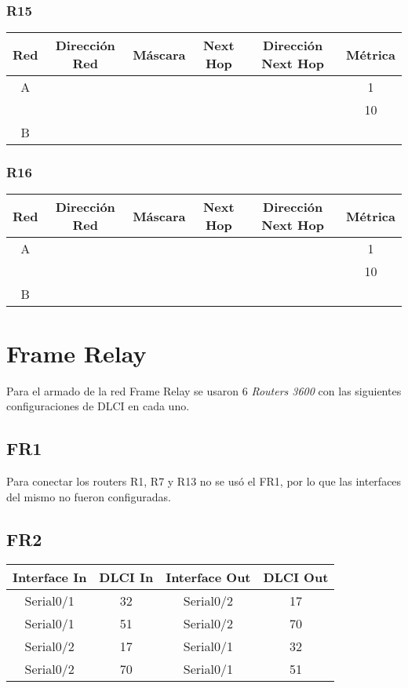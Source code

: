 \documentclass[12pt, a4paper, spanish]{article}
\begin{document}
\subsubsection{R15}
\begin{center}
\begin{tabular}{|c|c|c|c|c|c|}
	\hline
	Red & Dirección Red & Máscara & Next Hop & Dirección Next Hop & Métrica \\
	\hline
	\hline
	A &  &  &  &  & 1\\
 	  &  &  &  &  & 10 \\
	\hline	
	B & & & & &\\
	\hline
\end{tabular}
\end{center}

\subsubsection{R16}
\begin{center}
\begin{tabular}{|c|c|c|c|c|c|}
	\hline
	Red & Dirección Red & Máscara & Next Hop & Dirección Next Hop & Métrica \\
	\hline
	\hline
	A &  &  &  &  & 1\\
 	  &  &  &  &  & 10 \\
	\hline	
	B & & & & &\\
	\hline
\end{tabular}
\end{center}

\newpage
\section{Frame Relay}
Para el armado de la red Frame Relay se usaron 6 \emph{Routers 3600}
con las siguientes configuraciones de DLCI en cada uno.
\subsection{FR1}
Para conectar los routers R1, R7 y R13 no se usó el FR1, por lo que las 
interfaces del mismo no fueron configuradas.

\subsection{FR2}
\begin{center}
\begin{tabular}{|c|c|c|c|}
\hline
Interface In & DLCI In & Interface Out & DLCI Out \\
\hline
\hline
Serial0/1 & 32 & Serial0/2 & 17 \\
\hline
Serial0/1 & 51 & Serial0/2 & 70 \\
\hline
Serial0/2 & 17 & Serial0/1 & 32 \\
\hline
Serial0/2 & 70 & Serial0/1 & 51 \\
\hline
\end{tabular}
\end{center}
\end{document}
